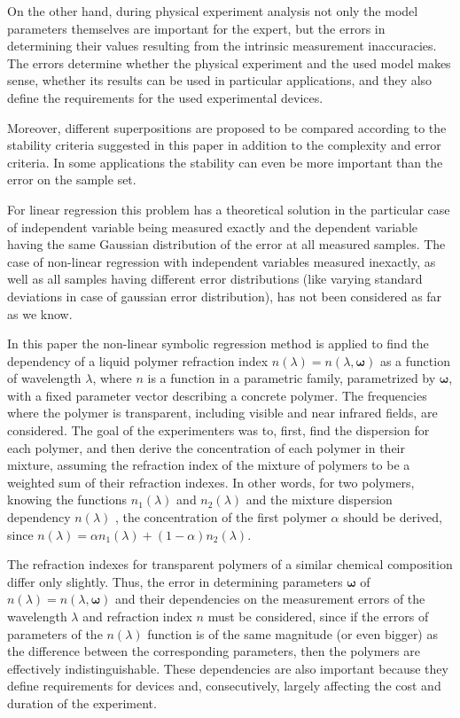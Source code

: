 \documentclass[11pt,a4paper]{article}
\theoremstyle{definition}
\begin{document}
On the other hand, during physical experiment analysis not only the model
parameters themselves are important for the expert, but the errors in
determining their values resulting from the intrinsic measurement inaccuracies.
The errors determine whether the physical experiment and the used model makes
sense, whether its results can be used in particular applications, and they also
define the requirements for the used experimental devices.

Moreover, different superpositions are proposed to be compared according to the
stability criteria suggested in this paper in addition to the complexity and
error criteria. In some applications the stability can even be more important
than the error on the sample set.

For linear regression this problem has a theoretical solution\cite{Vatunin05}
in the particular case of independent variable being measured exactly and the
dependent variable having the same Gaussian distribution of the error at all
measured samples. The case of non-linear regression with independent variables
measured inexactly, as well as all samples having
different error distributions (like varying standard deviations in case of gaussian
error distribution), has not been considered as far as we know.

In this paper the non-linear symbolic regression method is applied to find
the dependency of a liquid polymer refraction index $n(\lambda) = n(\lambda, \boldsymbol{\omega})$ as a function of
wavelength $\lambda$, where $n$ is a function in a parametric family,
parametrized by $\boldsymbol{\omega}$, with a fixed parameter vector
describing a concrete polymer. The frequencies where the polymer is
transparent, including visible and near infrared fields, are considered.
The goal of the
experimenters was to, first, find the dispersion for each polymer, and then
derive the concentration of each polymer in their mixture, assuming the
refraction index of the mixture of polymers to be a weighted sum of their refraction
indexes. In other words, for two polymers, knowing the functions
$n_1(\lambda)$ and $n_2(\lambda)$ and the mixture dispersion dependency $n(\lambda)$ ,
the concentration of the first polymer $\alpha$ should be derived, since
$n(\lambda) = \alpha n_1(\lambda) + (1 - \alpha) n_2(\lambda)$.

The refraction indexes for transparent polymers of a similar chemical
composition differ only slightly. Thus, the error in determining
parameters $\boldsymbol{\omega}$ of $n(\lambda) = n(\lambda, \boldsymbol{\omega})$
and their dependencies on the measurement errors
of the wavelength $\lambda$ and refraction index $n$ must be considered, since
if the errors of parameters of the $n(\lambda)$ function
is of the same magnitude (or even bigger) as the difference between the
corresponding parameters, then the polymers are effectively indistinguishable.
These dependencies are also important because they define requirements for 
devices and, consecutively, largely affecting the cost and duration of the
experiment.
\end{document}
